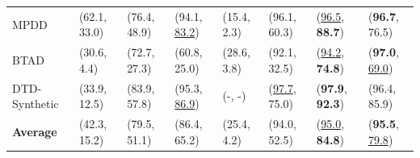 \begin{table}[htbp]
{\begin{tabular}{llllllll}
      MPDD & (62.1, 33.0) & (76.4, 48.9) & (94.1, \underline{83.2}) & (15.4, 2.3) & (96.1, 60.3) & (\underline{96.5}, \textbf{88.7}) & (\textbf{96.7}, 76.5) \\
      BTAD & (30.6, 4.4) & (72.7, 27.3) & (60.8, 25.0) & (28.6, 3.8) & (92.1, 32.5) & (\underline{94.2}, \textbf{74.8}) & (\textbf{97.0}, \underline{69.0}) \\
      DTD-Synthetic & (33.9, 12.5) & (83.9, 57.8) & (95.3, \underline{86.9}) & (-, -) & (\underline{97.7}, 75.0) & (\textbf{97.9}, \textbf{92.3}) & (96.4, 85.9) \\
      \midrule
      \textbf{Average} & (42.3, 15.2) & (79.5, 51.1) & (86.4, 65.2) & (25.4, 4.2) & (94.0, 52.5) & (\underline{95.0}, \textbf{84.8}) & (\textbf{95.5}, \underline{79.8}) \\
      \bottomrule
    \end{tabular}%
  }
\end{table}

